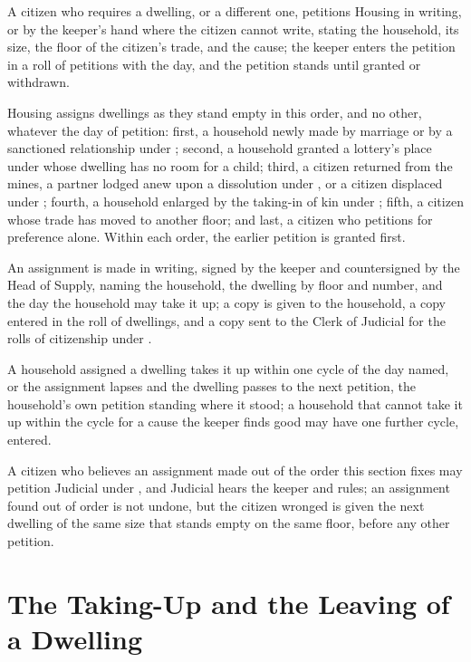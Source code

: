 \begin{clauses}
\item A citizen who requires a dwelling, or a different one, petitions Housing in writing, or by the keeper's hand where the citizen cannot write, stating the household, its size, the floor of the citizen's trade, and the cause; the keeper enters the petition in a roll of petitions with the day, and the petition stands until granted or withdrawn.
\item Housing assigns dwellings as they stand empty in this order, and no other, whatever the day of petition: first, a household newly made by marriage or by a sanctioned relationship under ; second, a household granted a lottery's place under  whose dwelling has no room for a child; third, a citizen returned from the mines, a partner lodged anew upon a dissolution under , or a citizen displaced under ; fourth, a household enlarged by the taking-in of kin under ; fifth, a citizen whose trade has moved to another floor; and last, a citizen who petitions for preference alone. Within each order, the earlier petition is granted first.
\item An assignment is made in writing, signed by the keeper and countersigned by the Head of Supply, naming the household, the dwelling by floor and number, and the day the household may take it up; a copy is given to the household, a copy entered in the roll of dwellings, and a copy sent to the Clerk of Judicial for the rolls of citizenship under .
\item A household assigned a dwelling takes it up within one cycle of the day named, or the assignment lapses and the dwelling passes to the next petition, the household's own petition standing where it stood; a household that cannot take it up within the cycle for a cause the keeper finds good may have one further cycle, entered.
\item A citizen who believes an assignment made out of the order this section fixes may petition Judicial under , and Judicial hears the keeper and rules; an assignment found out of order is not undone, but the citizen wronged is given the next dwelling of the same size that stands empty on the same floor, before any other petition.
\end{clauses}

\section{The Taking-Up and the Leaving of a Dwelling}
\label{sec:housing:taking-up-and-the-leaving-of-a-dwelling}

